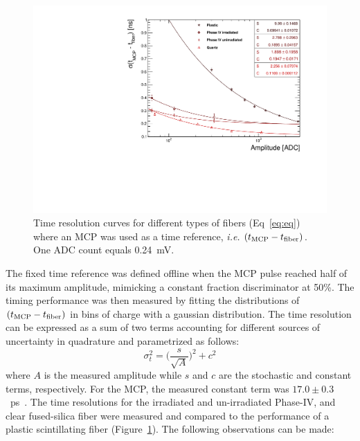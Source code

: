 \documentclass[a4paper,11pt]{article}
\begin{document}
\begin{figure}[ht]
\begin{center}
      \includegraphics[width=12cm]{Figures/fibres_time_res}
\caption{\small Time resolution curves for different types of fibers (Eq~\ref{eq:eq}) where an MCP was used as a time reference, {\it i.e.} $(t_{\rm MCP} - t_{\rm fiber})$.  One ADC count equals 0.24~mV.}
    \label{fig:fibres_time_res}
\end{center}
\end{figure}

The fixed time reference was defined offline when the MCP pulse reached half of its maximum amplitude, mimicking a constant fraction discriminator at 50\%. The timing performance was then measured by fitting the distributions of $(t_{\rm MCP} - t_{\rm fiber})$ in bins of charge with a gaussian distribution.  The time resolution can be expressed as a sum of two terms accounting for different sources of uncertainty in quadrature and parametrized as follows:
\begin{equation}
    \sigma_t^2 = \bigg( \frac{s}{\sqrt{A}} \bigg)^2 + c^2
    \label{eq:eq}
\end{equation}
where $A$ is the measured amplitude while $s$ and $c$ are the stochastic and constant terms, respectively. For the MCP, the measured constant term was $17.0\pm0.3$~ps~\cite{r-MCP}.  The time resolutions for the irradiated and un-irradiated Phase-IV, and clear fused-silica fiber were measured and compared to the performance of a plastic scintillating fiber (Figure~\ref{fig:fibres_time_res}).  The following observations can be made:
\end{document}
